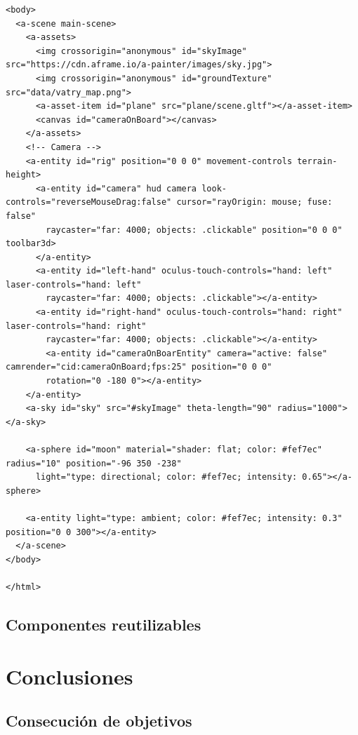 \documentclass[a4paper, 11pt]{book}
\begin{document}
\begin{verbatim}
<body>
  <a-scene main-scene>
    <a-assets>
      <img crossorigin="anonymous" id="skyImage" src="https://cdn.aframe.io/a-painter/images/sky.jpg">
      <img crossorigin="anonymous" id="groundTexture" src="data/vatry_map.png">
      <a-asset-item id="plane" src="plane/scene.gltf"></a-asset-item>
      <canvas id="cameraOnBoard"></canvas>
    </a-assets>
    <!-- Camera -->
    <a-entity id="rig" position="0 0 0" movement-controls terrain-height>
      <a-entity id="camera" hud camera look-controls="reverseMouseDrag:false" cursor="rayOrigin: mouse; fuse: false"
        raycaster="far: 4000; objects: .clickable" position="0 0 0" toolbar3d>
      </a-entity>
      <a-entity id="left-hand" oculus-touch-controls="hand: left" laser-controls="hand: left"
        raycaster="far: 4000; objects: .clickable"></a-entity>
      <a-entity id="right-hand" oculus-touch-controls="hand: right" laser-controls="hand: right"
        raycaster="far: 4000; objects: .clickable"></a-entity>
        <a-entity id="cameraOnBoarEntity" camera="active: false" camrender="cid:cameraOnBoard;fps:25" position="0 0 0"
        rotation="0 -180 0"></a-entity>
    </a-entity>
    <a-sky id="sky" src="#skyImage" theta-length="90" radius="1000"></a-sky>

    <a-sphere id="moon" material="shader: flat; color: #fef7ec" radius="10" position="-96 350 -238"
      light="type: directional; color: #fef7ec; intensity: 0.65"></a-sphere>

    <a-entity light="type: ambient; color: #fef7ec; intensity: 0.3" position="0 0 300"></a-entity>
  </a-scene>
</body>

</html>
\end{verbatim}
\section{Componentes reutilizables}
\label{sec:componentesreutilizables}

\clearpage
\chapter{Conclusiones}
\label{chap:conclusiones}


\section{Consecución de objetivos}
\label{sec:consecucion-objetivos}
\end{document}
